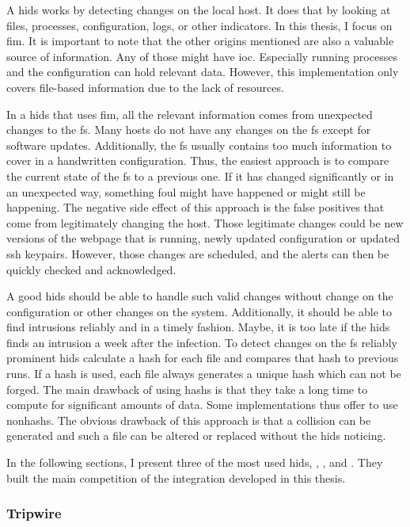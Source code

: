A \gls{hids} works by detecting changes on the local host. It does that by looking at files, processes, configuration, logs, or other indicators. In this thesis, I focus on \gls{fim}. It is important to note that the other origins mentioned are also a valuable source of information. Any of those might have \gls{ioc}. Especially running processes and the configuration can hold relevant data. However, this implementation only covers file-based information due to the lack of resources.


In a \gls{hids} that uses \gls{fim}, all the relevant information comes from unexpected changes to the \gls{fs}. Many hosts do not have any changes on the \gls{fs} except for software updates. Additionally, the \gls{fs} usually contains too much information to cover in a handwritten configuration. Thus, the easiest approach is to compare the current state of the \gls{fs} to a previous one. If it has changed significantly or in an unexpected way, something foul might have happened or might still be happening. The negative side effect of this approach is the false positives that come from legitimately changing the host. Those legitimate changes could be new versions of the webpage that is running, newly updated configuration or updated ssh keypairs. However, those changes are scheduled, and the alerts can then be quickly checked and acknowledged.

A good \gls{hids} should be able to handle such valid changes without change on the configuration or other changes on the system. Additionally, it should be able to find intrusions reliably and in a timely fashion. Maybe, it is too late if the \gls{hids} finds an intrusion a week after the infection. To detect changes on the \gls{fs} reliably prominent \gls{hids} calculate a hash for each file and compares that hash to previous runs. If a \gls{hash} is used, each file always generates a unique hash which can not be forged. The main drawback of using \glspl{hash} is that they take a long time to compute for significant amounts of data. Some implementations thus offer to use \glspl{nonhash}. The obvious drawback of this approach is that a \gls{collision} can be generated and such a file can be altered or replaced without the \gls{hids} noticing.

In the following sections, I present three of the most used \gls{hids}, , , and . They built the main competition of the integration developed in this thesis.

\subsubsection{Tripwire}
\label{sec:tripwire}

